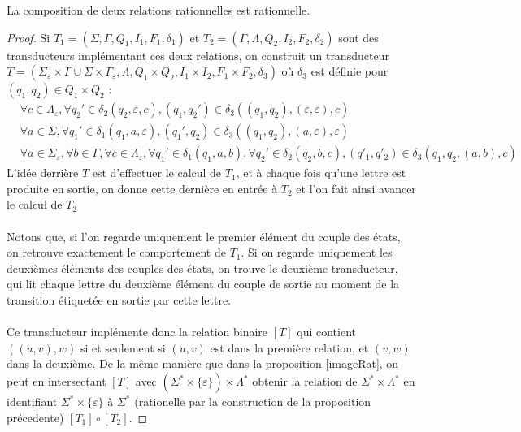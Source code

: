 \documentclass{scrartcl}
\begin{document}
\begin{flushleft}
\begin{prop}[Composition]
    La composition de deux relations rationnelles est rationnelle.
\end{prop}

\begin{proof}
    Si $T_1 = (\Sigma, \Gamma, Q_1, I_1, F_1, \delta_1)$ et $T_2 = (\Gamma, \Lambda, Q_2, I_2, F_2, \delta_2)$ sont des transducteurs implémentant ces deux relations,
    on construit un transducteur
    $T = (\Sigma_{\varepsilon} \times \Gamma \cup \Sigma \times \Gamma_{\varepsilon}, \Lambda, Q_1 \times Q_2, I_1 \times I_2, F_1 \times F_2, \delta_3)$
    où $\delta_3$ est définie pour $(q_1, q_2) \in Q_1 \times Q_2$ :
    \begin{equation*}
        \begin{split}
            &\forall c \in \Lambda_{\varepsilon}, \forall q_2' \in \delta_2(q_2, \varepsilon, c), (q_1, q_2') \in \delta_3((q_1, q_2),
            (\varepsilon, \varepsilon), c)\\
            &\forall a \in \Sigma, \forall q_1' \in \delta_1(q_1, a, \varepsilon), (q_1', q_2) \in \delta_3((q_1, q_2), (a, \varepsilon), \varepsilon)\\
            &\forall a \in \Sigma_{\varepsilon}, \forall b \in \Gamma, \forall c \in \Lambda_{\varepsilon},
            \forall q_1' \in \delta_1(q_1, a, b), \forall q_2' \in \delta_2(q_2, b, c), (q'_1, q'_2) \in \delta_3(q_1, q_2, (a, b), c)
        \end{split}
    \end{equation*}
    L'idée derrière $T$ est d'effectuer le calcul de $T_1$, et à chaque fois qu'une lettre est produite en sortie, on donne cette dernière en entrée
    à $T_2$ et l'on fait ainsi avancer le calcul de $T_2$
    \\~\\
    Notons que, si l'on regarde uniquement le premier élément du couple des états, on retrouve exactement le comportement de $T_1$.
    Si on regarde uniquement les deuxièmes éléments des couples des états, on trouve le deuxième transducteur, qui lit chaque lettre du deuxième élément
    du couple de sortie au moment de la transition étiquetée en sortie par cette lettre.
    \\~\\
    Ce transducteur implémente donc la relation binaire $[T]$ qui contient $((u, v), w)$ si et seulement si $(u, v)$ est dans la première relation,
    et $(v, w)$ dans la deuxième. De la même manière que dans la proposition \ref{imageRat}, on peut en intersectant $[T]$
    avec $(\Sigma^* \times \{\varepsilon\}) \times \Lambda^*$ obtenir la relation de $\Sigma^* \times \Lambda^*$
    en identifiant $\Sigma^* \times \{\varepsilon\}$ à $\Sigma^*$ (rationelle par la construction de la proposition précedente) $[T_1] \circ [T_2]$.
\end{proof}


\end{flushleft}
\end{document}
